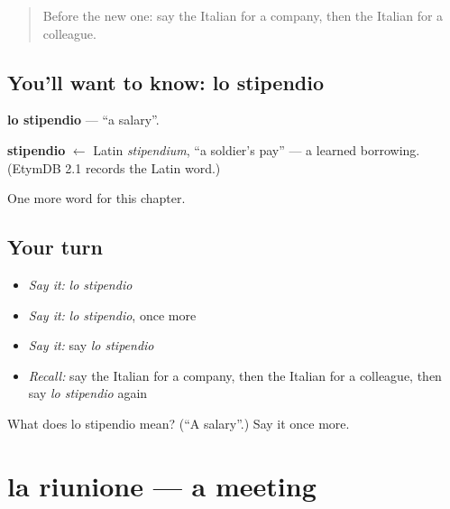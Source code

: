 \label{lesson:IT-C172-stipendio}



\begin{quote}
Before the new one: say the Italian for a company, then the Italian for a colleague.
\end{quote}

\subsection*{You'll want to know: lo stipendio}
\textbf{lo stipendio} — \textquotedblleft{}a salary\textquotedblright{}.

\begin{cousinweb}
\textbf{stipendio} $\leftarrow$ Latin \emph{stipendium}, \textquotedblleft{}a soldier's pay\textquotedblright{} — a learned borrowing. (EtymDB 2.1 records the Latin word.)
\end{cousinweb}

\begin{grammarlens}[title={What you've built}]
One more word for this chapter.
\end{grammarlens}

\subsection*{Your turn}
\begin{itemize}
\raggedright
  \item \emph{Say it:} \emph{lo stipendio}
  \item \emph{Say it:} \emph{lo stipendio}, once more
  \item \emph{Say it:} say \emph{lo stipendio}
  \item \emph{Recall:} say the Italian for a company, then the Italian for a colleague, then say \emph{lo stipendio} again
\end{itemize}

\begin{tcolorbox}[breakable,colback=teal!4,colframe=teal!35!black,title={Before you move on}]
What does lo stipendio mean? (\textquotedblleft{}A salary\textquotedblright{}.) Say it once more.
\end{tcolorbox}
\section[la riunione]{la riunione — a meeting}

\label{lesson:IT-C172-riunione}



